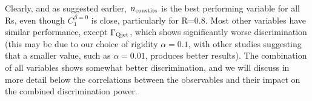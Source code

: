 %
Clearly, and as suggested earlier, $n_{\rm constits}$ is the best performing variable for all Rs, even though $C_1^{\beta=0}$ is close, particularly
for R=0.8. Most other variables have similar performance, except $\Gamma_{\rm Qjet}$, which shows significantly worse
discrimination (this may be due to our choice of
rigidity $\alpha = 0.1$, with other studies suggesting that a smaller value,
such as $\alpha = 0.01$, produces better results). The combination of all variables shows somewhat better discrimination, and
we will discuss in more detail below the correlations between the observables and their impact on the combined discrimination power.

%
\begin{figure}
\centering
{}
\\
\\

\end{figure}
